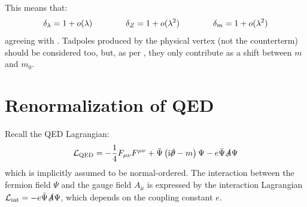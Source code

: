 This means that:
\begin{equation}
  \delta_\lambda = 1 + o(\lambda)
  \qquad \qquad
  \delta_Z = 1 + o(\lambda^2)
  \qquad \qquad
  \delta_m = 1 + o(\lambda^2)
\end{equation}
agreeing with . Tadpoles produced by the physical vertex (not the counterterm) should be considered too, but, as per , they only contribute as a shift between $ m $ and $ m_0 $.


\newpage

\section{Renormalization of QED}

Recall the QED Lagrangian:
\begin{equation}
  \lag_\text{QED} = - \frac{1}{4} F_{\mu \nu} F^{\mu \nu} + \bar{\Psi} \left( \img \slashed{\pa} - m \right) \Psi - e \bar{\Psi} \slashed{A} \Psi
  \label{eq:qed-lagrangian}
\end{equation}
which is implicitly assumed to be normal-ordered. The interaction between the fermion field $ \Psi $ and the gauge field $ A_\mu $ is expressed by the interaction Lagrangian $ \mathcal{L}_\text{int} = - e \bar{\Psi} \slashed{A} \Psi $, which depends on the coupling constant $ e $.


